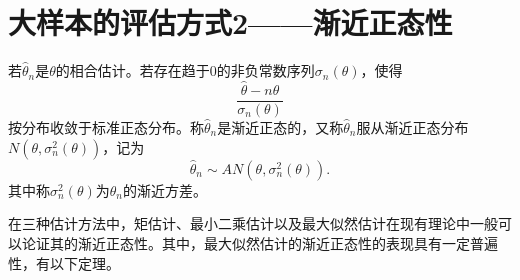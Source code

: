 \section{大样本的评估方式2——渐近正态性}

\begin{definition}
    若$\hat{\theta}_n$是$\theta$的相合估计。若存在趋于$0$的非负常数序列$\sigma_n(\theta)$，使得
    $$
    \frac{\hat{\theta}-n \theta}{\sigma_n(\theta)}
    $$
    按分布收敛于标准正态分布。称$\hat{\theta}_n$是渐近正态的，又称$\hat{\theta}_n$服从渐近正态分布$N(\theta,\sigma_n^2(\theta))$，记为
    $$
    \hat{\theta}_n \sim AN (\theta,\sigma_n^2(\theta)).
    $$
    其中称$\sigma_n^2(\theta)$为$\hat{\theta}_n$的渐近方差。
\end{definition}
在三种估计方法中，矩估计、最小二乘估计以及最大似然估计在现有理论中一般可以论证其的渐近正态性。其中，最大似然估计的渐近正态性的表现具有一定普遍性，有以下定理。


